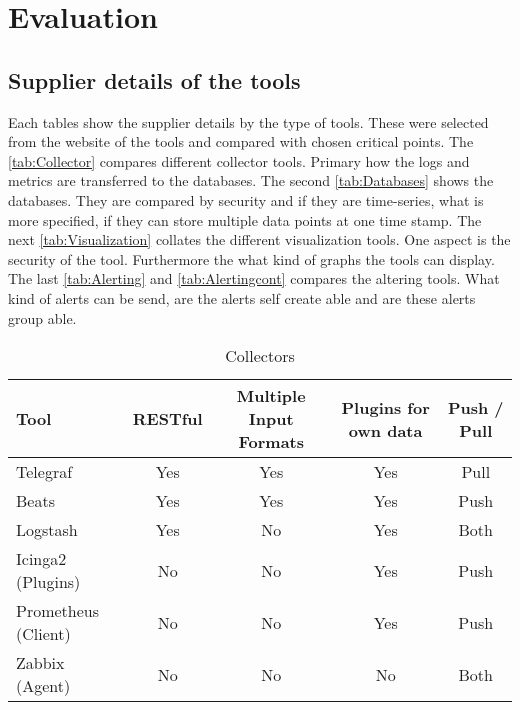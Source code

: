 \chapter{Evaluation} %
\section{Supplier details of the tools}
Each tables show the supplier details by the type of tools. These were selected from the website of the tools and compared with chosen critical points. The \vref{tab:Collector} compares different collector tools. Primary how the logs and metrics are transferred to the databases. The second \cref{tab:Databases} shows the databases. They are compared by security and if they are time-series, what is more specified, if they can store multiple data points at one time stamp. The next \cref{tab:Visualization} collates the different visualization tools. One aspect is the security of the tool. Furthermore the what kind of graphs the tools can display. The last \cref{tab:Alerting} and \cref{tab:Alertingcont} compares the altering tools. What kind of alerts can be send, are the alerts self create able and are these alerts group able. 


\begin{table}
\centering
\label{tab:Collector}
\begin{tabular}{p{3cm}cccc}
\hline
Tool & RESTful                     & Multiple Input Formats      & Plugins for own data        & Push / Pull                 \\
\hline
Telegraf                     & Yes & Yes                         & Yes                         & Pull                         \\
Beats                        & Yes                         & Yes & Yes                         & Push                         \\
Logstash                     & Yes                         & No                          & Yes & Both                         \\
Icinga2 (Plugins)            & No                          & No                          & Yes                         & Push \\
Prometheus (Client)          & No                          & No                          & Yes                         & Push \\
Zabbix (Agent)               & No                          & No                          & No  & Both \\
\hline                        
\end{tabular}
\caption{Collectors}
\end{table}


